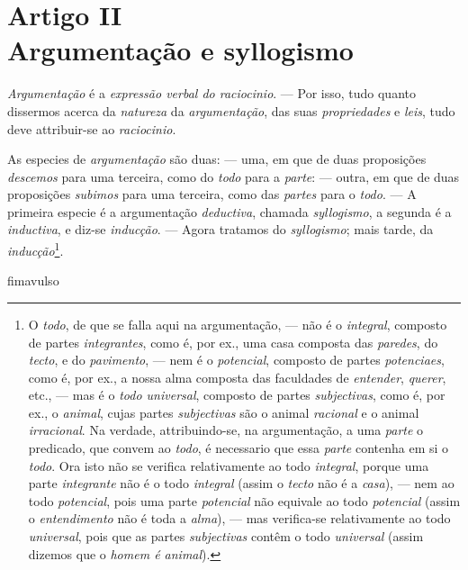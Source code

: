 \section*{Artigo II\\ Argumentação e syllogismo}

 \emph{Argumentação} é a \emph{expressão verbal do raciocinio}.
--- Por isso, tudo quanto dissermos acerca da \emph{natureza} da \emph{argumentação}, das
suas \emph{propriedades} e \emph{leis}, tudo deve attribuir-se ao \emph{raciocinio}.

 As especies de \emph{argumentação} são duas: --- uma,
em que de duas proposições \emph{descemos} para uma terceira, como do \emph{todo} para a
\emph{parte}: --- outra, em que de duas proposições \emph{subimos} para uma terceira, como
das \emph{partes} para o \emph{todo}. --- A primeira especie é a argumentação
\emph{deductiva}, chamada \emph{syllogismo}, a segunda é a \emph{inductiva}, e diz-se
\emph{inducção}. --- Agora tratamos do \emph{syllogismo}; mais tarde, da
\emph{inducção}\footnote{O \emph{todo}, de que se falla aqui na argumentação, --- não é o
\emph{integral}, composto de partes \emph{integrantes}, como é, por ex., uma casa composta
das \emph{paredes}, do \emph{tecto}, e do \emph{pavimento}, --- nem é o \emph{potencial},
composto de partes \emph{potenciaes}, como é, por ex., a nossa alma composta das
faculdades de \emph{entender}, \emph{querer}, etc., --- mas é o \emph{todo universal},
composto de partes \emph{subjectivas}, como é, por ex., o \emph{animal}, cujas partes
\emph{subjectivas} são o animal \emph{racional} e o animal \emph{irracional}. Na verdade,
attribuindo-se, na argumentação, a uma \emph{parte} o predicado, que convem ao
\emph{todo}, é necessario que essa \emph{parte} contenha em si o \emph{todo}. Ora isto não
se verifica relativamente ao todo \emph{integral}, porque uma parte \emph{integrante} não
é o todo \emph{integral} (assim o \emph{tecto} não é a \emph{casa}), --- nem ao todo
\emph{potencial}, pois uma parte \emph{potencial} não equivale ao todo \emph{potencial}
(assim o \emph{entendimento} não é toda a \emph{alma}), --- mas verifica-se relativamente
ao todo \emph{universal}, pois que as partes \emph{subjectivas} contêm o todo
\emph{universal} (assim dizemos que o \emph{homem é animal}).}.

\csname fimavulso\endcsname
